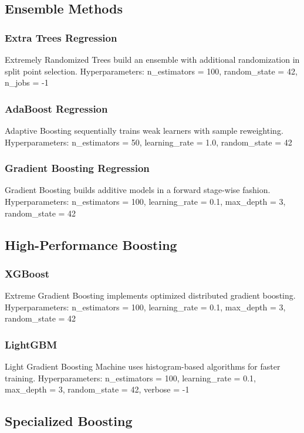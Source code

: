 \subsection{Ensemble Methods}

\subsubsection{Extra Trees Regression}
Extremely Randomized Trees build an ensemble with additional randomization in split point selection. Hyperparameters: n\_estimators = 100, random\_state = 42, n\_jobs = -1

\subsubsection{AdaBoost Regression}
Adaptive Boosting sequentially trains weak learners with sample reweighting. Hyperparameters: n\_estimators = 50, learning\_rate = 1.0, random\_state = 42

\subsubsection{Gradient Boosting Regression}
Gradient Boosting builds additive models in a forward stage-wise fashion. Hyperparameters: n\_estimators = 100, learning\_rate = 0.1, max\_depth = 3, random\_state = 42

\subsection{High-Performance Boosting}

\subsubsection{XGBoost}
Extreme Gradient Boosting implements optimized distributed gradient boosting. Hyperparameters: n\_estimators = 100, learning\_rate = 0.1, max\_depth = 3, random\_state = 42

\subsubsection{LightGBM}
Light Gradient Boosting Machine uses histogram-based algorithms for faster training. Hyperparameters: n\_estimators = 100, learning\_rate = 0.1, max\_depth = 3, random\_state = 42, verbose = -1

\subsection{Specialized Boosting}

